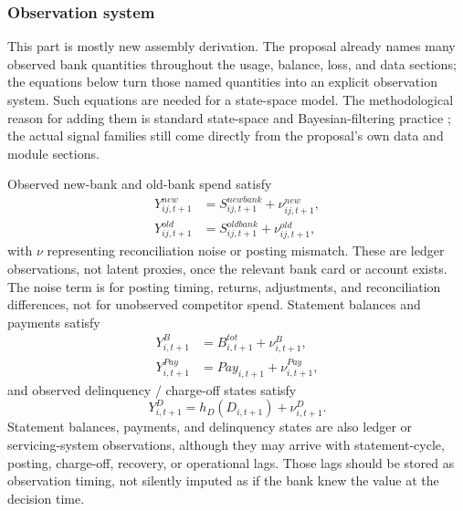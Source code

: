 \documentclass[11pt]{article}
\newcommand{\1}{\mathbf{1}}
\begin{document}
\subsubsection{Observation system}
\label{subsec:state-space-observations}

This part is mostly new assembly derivation. The proposal already names many
observed bank quantities throughout the usage, balance, loss, and data sections;
the equations below turn those named quantities into an explicit observation
system. Such equations are needed for a state-space model. The methodological
reason for adding them is standard
state-space and Bayesian-filtering practice
\citep{durbinkoopman2012ssm,westharrison1997bfdm,doucet2001smc}; the actual
signal families still come directly from the proposal's own data and module
sections.

Observed new-bank and old-bank spend satisfy
\begin{align}
  Y^{new}_{ij,t+1} &= S^{newbank}_{ij,t+1} + \nu^{new}_{ij,t+1},
    \label{eq:ss-obs-new}\\
  Y^{old}_{ij,t+1} &= S^{oldbank}_{ij,t+1} + \nu^{old}_{ij,t+1},
    \label{eq:ss-obs-old}
\end{align}
with $\nu$ representing reconciliation noise or posting mismatch.
These are ledger observations, not latent proxies, once the relevant bank card
or account exists. The noise term is for posting timing, returns, adjustments,
and reconciliation differences, not for unobserved competitor spend.
Statement balances and payments satisfy
\begin{align}
  Y^B_{i,t+1} &= B^{tot}_{i,t+1} + \nu^B_{i,t+1},
    \label{eq:ss-obs-balance}\\
  Y^{Pay}_{i,t+1} &= Pay_{i,t+1} + \nu^{Pay}_{i,t+1},
    \label{eq:ss-obs-payment}
\end{align}
and observed delinquency / charge-off states satisfy
\begin{equation}
  Y^D_{i,t+1} = h_D(D_{i,t+1}) + \nu^{D}_{i,t+1}.
  \label{eq:ss-obs-delinquency}
\end{equation}
Statement balances, payments, and delinquency states are also ledger or
servicing-system observations, although they may arrive with statement-cycle,
posting, charge-off, recovery, or operational lags. Those lags should be stored
as observation timing, not silently imputed as if the bank knew the value at the
decision time.
\end{document}
